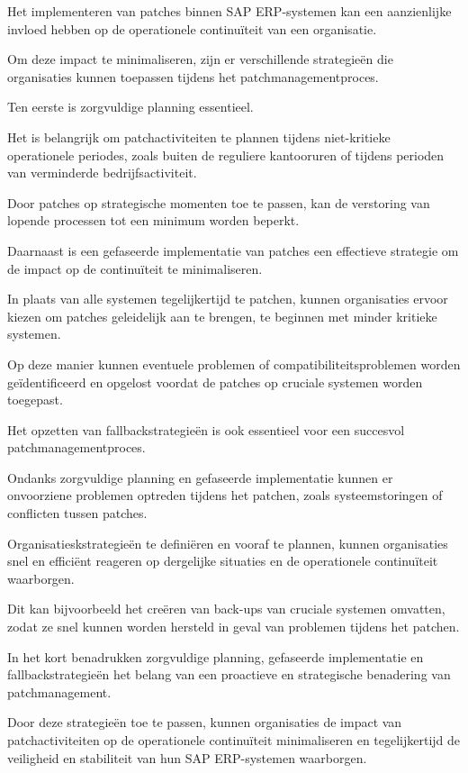 Het implementeren van patches binnen SAP ERP-systemen kan een aanzienlijke invloed hebben op de operationele continuïteit van een organisatie.

 Om deze impact te minimaliseren, zijn er verschillende strategieën die organisaties kunnen toepassen tijdens het patchmanagementproces.


Ten eerste is zorgvuldige planning essentieel.

 Het is belangrijk om patchactiviteiten te plannen tijdens niet-kritieke operationele periodes, zoals buiten de reguliere kantooruren of tijdens perioden van verminderde bedrijfsactiviteit.

 Door patches op strategische momenten toe te passen, kan de verstoring van lopende processen tot een minimum worden beperkt.


Daarnaast is een gefaseerde implementatie van patches een effectieve strategie om de impact op de continuïteit te minimaliseren.

 In plaats van alle systemen tegelijkertijd te patchen, kunnen organisaties ervoor kiezen om patches geleidelijk aan te brengen, te beginnen met minder kritieke systemen.

 Op deze manier kunnen eventuele problemen of compatibiliteitsproblemen worden geïdentificeerd en opgelost voordat de patches op cruciale systemen worden toegepast.


Het opzetten van fallbackstrategieën is ook essentieel voor een succesvol patchmanagementproces.

 Ondanks zorgvuldige planning en gefaseerde implementatie kunnen er onvoorziene problemen optreden tijdens het patchen, zoals systeemstoringen of conflicten tussen patches.

 Organisatieskstrategieën te definiëren en vooraf te plannen, kunnen organisaties snel en efficiënt reageren op dergelijke situaties en de operationele continuïteit waarborgen.

 Dit kan bijvoorbeeld het creëren van back-ups van cruciale systemen omvatten, zodat ze snel kunnen worden hersteld in geval van problemen tijdens het patchen.



In het kort benadrukken zorgvuldige planning, gefaseerde implementatie en fallbackstrategieën het belang van een proactieve en strategische benadering van patchmanagement.

 Door deze strategieën toe te passen, kunnen organisaties de impact van patchactiviteiten op de operationele continuïteit minimaliseren en tegelijkertijd de veiligheid en stabiliteit van hun SAP ERP-systemen waarborgen.



